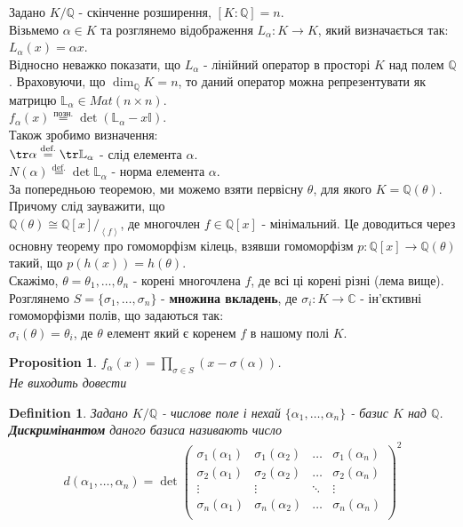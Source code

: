 \documentclass[a4paper, 14pt]{extarticle}
\theoremstyle{theoremdd}
\theoremstyle{theoremdd}
\newtheorem{definition}[theorem]{Definition}
\theoremstyle{theoremdd}
\theoremstyle{theoremdd}
\theoremstyle{theoremdd}
\newtheorem{proposition}[theorem]{Proposition}
\theoremstyle{theoremdd}
\theoremstyle{theoremdd}
\theoremstyle{theoremdd}
\begin{document}
Задано $K/\mathbb{Q}$ - скінченне розширення, $[K:\mathbb{Q}]=n$.\\
Візьмемо $\alpha \in K$ та розглянемо відображення $L_\alpha: K \to K$, який визначається так:\\
$L_\alpha (x) = \alpha x$.\\
Відносно неважко показати, що $L_\alpha$ - лінійний оператор в просторі $K$ над полем $\mathbb{Q}$. Враховуючи, що $\dim_\mathbb{Q} K = n$, то даний оператор можна репрезентувати як матрицю $\mathbb{L}_\alpha \in Mat(n \times n)$.\\
$f_\alpha (x) \overset{\text{позн.}}{=} \det (\mathbb{L}_\alpha - x \mathbb{I})$.\\
Також зробимо визначення:\\
$\tr \alpha \overset{\text{def.}}{=} \tr \mathbb{L}_\alpha$ - слід елемента $\alpha$.\\
$N(\alpha) \overset{\text{def.}}{=} \det \mathbb{L}_\alpha$ - норма елемента $\alpha$.
\bigskip \\
За попередньою теоремою, ми можемо взяти первісну $\theta$, для якого $K = \mathbb{Q}(\theta)$. Причому слід зауважити, що\\
$\mathbb{Q}(\theta) \cong \mathbb{Q}[x] /_{ \left<f\right>}$, де многочлен $f \in \mathbb{Q}[x]$ - мінімальний. Це доводиться через основну теорему про гомоморфізм кілець, взявши гомоморфізм $p: \mathbb{Q}[x] \to \mathbb{Q}(\theta)$ такий, що $p(h(x))=h(\theta)$.\\
Скажімо, $\theta = \theta_1,\dots,\theta_n$ - корені многочлена $f$, де всі ці корені різні (лема вище).\\
Розглянемо $S = \{\sigma_1,\dots,\sigma_n\}$ - \textbf{множина вкладень}, де $\sigma_i: K \to \mathbb{C}$ - ін'єктивні гомоморфізми полів, що задаються так:\\
$\sigma_i(\theta) = \theta_i$, де $\theta$ елемент який є коренем $f$ в нашому полі $K$.

\begin{proposition}
$f_\alpha(x) = \displaystyle\prod_{\sigma \in S} (x-\sigma(\alpha))$.\\
\textit{Не виходить довести}
\end{proposition}

\begin{definition}
Задано $K/\mathbb{Q}$ - числове поле і нехай $\{\alpha_1,\dots,\alpha_n\}$ - базис $K$ над $\mathbb{Q}$.\\
\textbf{Дискримінантом} даного базиса називають число
\begin{align*}
d(\alpha_1,\dots,\alpha_n) = \det \begin{pmatrix}
\sigma_1(\alpha_1) & \sigma_1(\alpha_2) & \dots & \sigma_1(\alpha_n) \\
\sigma_2(\alpha_1) & \sigma_2(\alpha_2) & \dots & \sigma_2(\alpha_n) \\
\vdots & \vdots & \ddots & \vdots \\
\sigma_n(\alpha_1) & \sigma_n(\alpha_2) & \dots & \sigma_n(\alpha_n) \\
\end{pmatrix}^2
\end{align*}
\end{definition}
\end{document}

